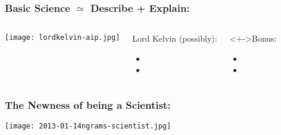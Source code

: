 \begin{frame}
  \frametitle{Basic Science $\simeq$ Describe + Explain:}

  \begin{columns}
    \texttt{[image: lordkelvin-aip.jpg]}
    \begin{block}{Lord Kelvin (possibly):}
      \begin{itemize}
      \item<+->
      \item<+-> 
      \end{itemize}
    \end{block}
    \begin{block}<+->{Bonus:}
      \begin{itemize}
      \item<+->
      \item<+->
      \end{itemize}
    \end{block}

  \end{columns}

\end{frame}


\begin{frame}
  \frametitle{The Newness of being a Scientist:}

  \texttt{[image: 2013-01-14ngrams-scientist.jpg]}

\end{frame}



